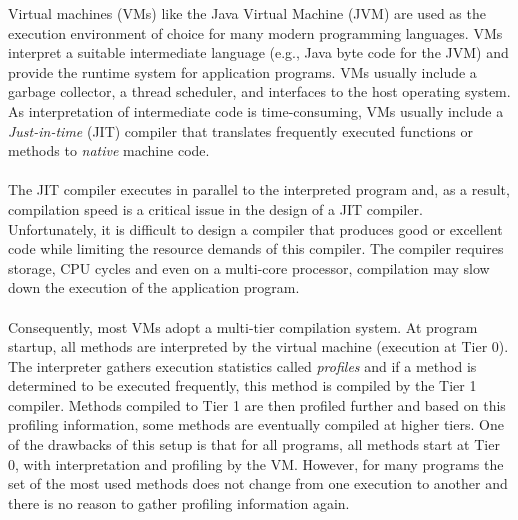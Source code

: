 Virtual machines (VMs) like the Java Virtual Machine (JVM) are used as the execution environment of choice for many modern programming languages. 
VMs interpret a suitable intermediate language (e.g., Java byte code for the JVM) and provide the runtime system for application programs. VMs usually include a garbage collector, a thread scheduler, and interfaces to the host operating system. 
As interpretation of intermediate code is time-consuming, VMs usually include a \textit{Just-in-time} (JIT) compiler that translates frequently executed functions or methods to \textit{native} machine code.
\\\\
The JIT compiler executes in parallel to the interpreted program and, as a result, compilation speed is a critical issue in the design of a JIT compiler.
Unfortunately, it is difficult to design a compiler that produces good or excellent code while limiting the resource demands of this compiler. The compiler requires storage, CPU cycles and even on a multi-core processor, compilation may slow down the execution of the application program.
\\\\
Consequently, most VMs adopt a multi-tier compilation system.
At program startup, all methods are interpreted by the virtual machine (execution at Tier 0). The interpreter gathers execution statistics called \textit{profiles} and if a method is determined to be executed frequently, this method is compiled by the Tier 1 compiler. Methods compiled to Tier 1 are then profiled further and based on this profiling information, some methods are eventually compiled at higher tiers.
One of the drawbacks of this setup is that for all programs, all methods start at Tier 0, with interpretation and profiling by the VM. However, for many programs the set of the most used methods does not change from one execution to another and there is no reason to gather profiling information again. 
